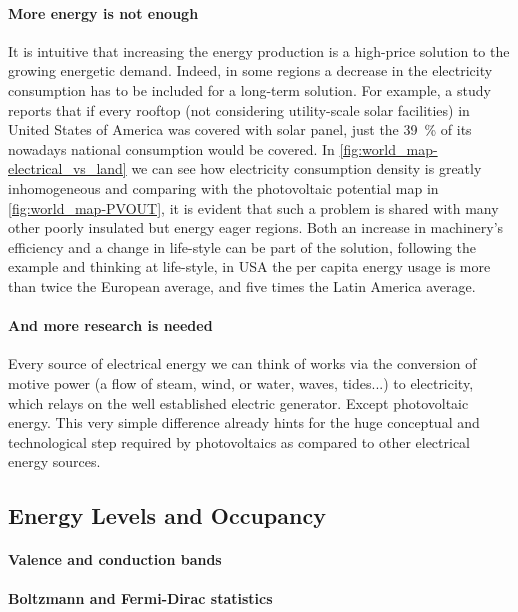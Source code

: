 	\paragraph{More energy is not enough} It is intuitive that increasing the energy production is a high-price solution to the growing energetic demand.
	Indeed, in some regions a decrease in the electricity consumption has to be included for a long-term solution.
	For example, a study\cite{Margolis2016} reports that if every rooftop (not considering utility-scale solar facilities) in United States of America was covered with solar panel, just the 39~\% of its nowadays national consumption would be covered.
	In \cref{fig:world_map-electrical_vs_land} we can see how electricity consumption density is greatly inhomogeneous and comparing with the photovoltaic potential map in \cref{fig:world_map-PVOUT}, it is evident that such a problem is shared with many other poorly insulated but energy eager regions.
	Both an increase in machinery's efficiency and a change in life-style can be part of the solution, following the example and thinking at life-style, in USA the per capita energy usage is more than twice the European average, and five times the Latin America average.\cite{IEA}

	\paragraph{And more research is needed} Every source of electrical energy we can think of works via the conversion of motive power (a flow of steam, wind, or water, waves, tides...) to electricity, which relays on the well established electric generator. Except photovoltaic energy. This very simple difference already hints for the huge conceptual and technological step required by photovoltaics as compared to other electrical energy sources.


\subsection{Energy Levels and Occupancy}

\paragraph{Valence and conduction bands}

\paragraph{Boltzmann and Fermi-Dirac statistics}

